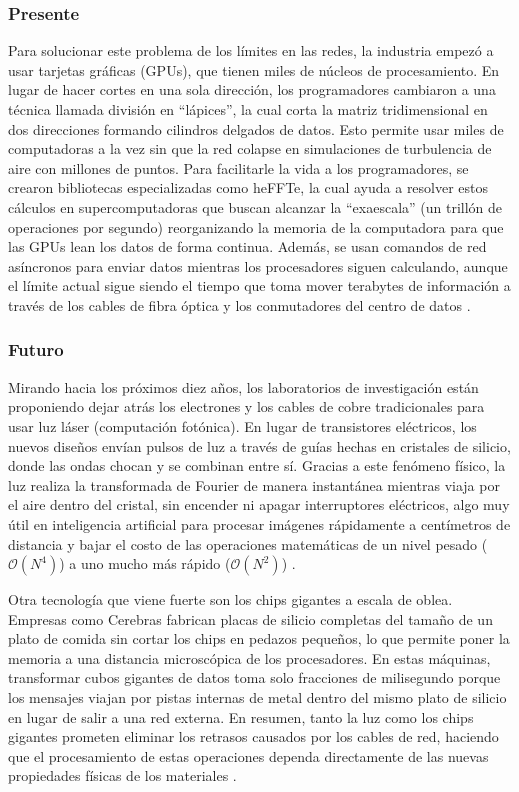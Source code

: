 \subsubsection{Presente}

Para solucionar este problema de los límites en las redes, la industria empezó a usar tarjetas gráficas (GPUs), que tienen miles de núcleos de procesamiento. En lugar de hacer cortes en una sola dirección, los programadores cambiaron a una técnica llamada división en ``lápices'', la cual corta la matriz tridimensional en dos direcciones formando cilindros delgados de datos. Esto permite usar miles de computadoras a la vez sin que la red colapse en simulaciones de turbulencia de aire con millones de puntos. Para facilitarle la vida a los programadores, se crearon bibliotecas especializadas como heFFTe, la cual ayuda a resolver estos cálculos en supercomputadoras que buscan alcanzar la ``exaescala'' (un trillón de operaciones por segundo) reorganizando la memoria de la computadora para que las GPUs lean los datos de forma continua. Además, se usan comandos de red asíncronos para enviar datos mientras los procesadores siguen calculando, aunque el límite actual sigue siendo el tiempo que toma mover terabytes de información a través de los cables de fibra óptica y los conmutadores del centro de datos \cite{tomov:heffte:2020}.

\subsubsection{Futuro}

Mirando hacia los próximos diez años, los laboratorios de investigación están proponiendo dejar atrás los electrones y los cables de cobre tradicionales para usar luz láser (computación fotónica). En lugar de transistores eléctricos, los nuevos diseños envían pulsos de luz a través de guías hechas en cristales de silicio, donde las ondas chocan y se combinan entre sí. Gracias a este fenómeno físico, la luz realiza la transformada de Fourier de manera instantánea mientras viaja por el aire dentro del cristal, sin encender ni apagar interruptores eléctricos, algo muy útil en inteligencia artificial para procesar imágenes rápidamente a centímetros de distancia y bajar el costo de las operaciones matemáticas de un nivel pesado ($\mathcal{O}(N^4)$) a uno mucho más rápido ($\mathcal{O}(N^2)$) \cite{zhang:photonic-fourier:2023}.

Otra tecnología que viene fuerte son los chips gigantes a escala de oblea. Empresas como Cerebras fabrican placas de silicio completas del tamaño de un plato de comida sin cortar los chips en pedazos pequeños, lo que permite poner la memoria a una distancia microscópica de los procesadores. En estas máquinas, transformar cubos gigantes de datos toma solo fracciones de milisegundo porque los mensajes viajan por pistas internas de metal dentro del mismo plato de silicio en lugar de salir a una red externa. En resumen, tanto la luz como los chips gigantes prometen eliminar los retrasos causados por los cables de red, haciendo que el procesamiento de estas operaciones dependa directamente de las nuevas propiedades físicas de los materiales \cite{nowak:wafer-scale-fft:2022}.

